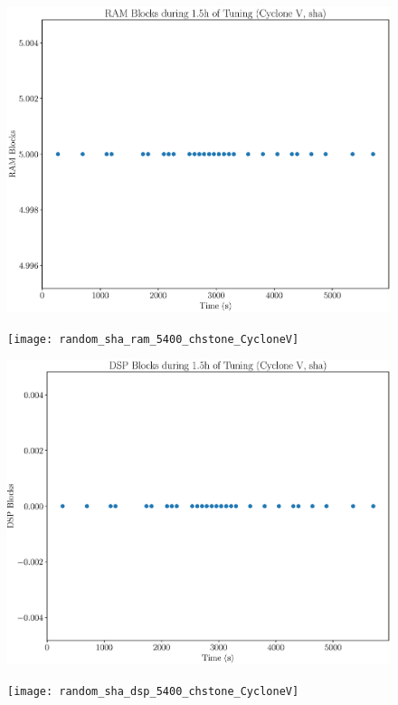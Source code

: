 \documentclass[12pt, a4paper]{article}
\begin{document}
\begin{figure}[htpb]
    \centering
    \noindent
    \begin{minipage}{.48\textwidth}
        \centering
        \includegraphics[scale=.25]{sha_ram_5400_chstone_CycloneV}
    \end{minipage}%
    \hfill
    \begin{minipage}{.48\textwidth}
        \centering
        \texttt{[image: random\_sha\_ram\_5400\_chstone\_CycloneV]}
    \end{minipage}%

    \begin{minipage}{.48\textwidth}
        \includegraphics[scale=.25]{sha_dsp_5400_chstone_CycloneV}
    \end{minipage}%
    \hfill
    \begin{minipage}{.48\textwidth}
        \texttt{[image: random\_sha\_dsp\_5400\_chstone\_CycloneV]}
    \end{minipage}%


\end{figure}
\end{document}

